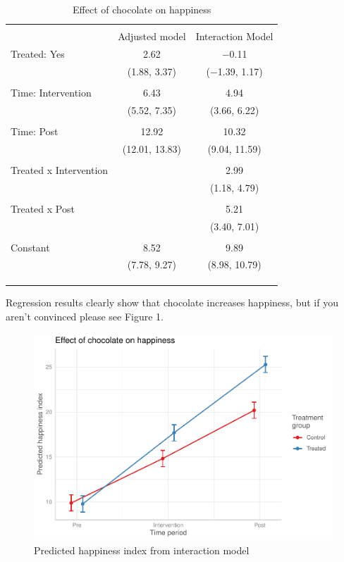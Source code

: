 \documentclass[
]{article}
\begin{document}
\begin{table}[!htbp] \centering 
  \caption{Effect of chocolate on happiness} 
  \label{} 
\begin{tabular}{@{\extracolsep{5pt}}lcc} 
\\[-1.8ex]\hline 
\hline \\[-1.8ex] 
 & Adjusted model & Interaction Model \\ 
 Treated: Yes & 2.62 & $-$0.11 \\ 
  & (1.88, 3.37) & ($-$1.39, 1.17) \\ 
  & & \\ 
 Time: Intervention & 6.43 & 4.94 \\ 
  & (5.52, 7.35) & (3.66, 6.22) \\ 
  & & \\ 
 Time: Post & 12.92 & 10.32 \\ 
  & (12.01, 13.83) & (9.04, 11.59) \\ 
  & & \\ 
 Treated x Intervention &  & 2.99 \\ 
  &  & (1.18, 4.79) \\ 
  & & \\ 
 Treated x Post &  & 5.21 \\ 
  &  & (3.40, 7.01) \\ 
  & & \\ 
 Constant & 8.52 & 9.89 \\ 
  & (7.78, 9.27) & (8.98, 10.79) \\ 
  & & \\ 
\hline \\[-1.8ex] 
\hline 
\hline \\[-1.8ex] 
\end{tabular} 
\end{table}

Regression results clearly show that chocolate increases happiness, but
if you aren't convinced please see Figure 1.

\begin{figure}
\centering
\includegraphics{choc-paper-rmd_files/figure-latex/figure1-1.pdf}
\caption{Predicted happiness index from interaction model}
\end{figure}
\end{document}
